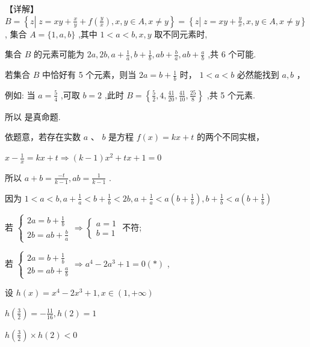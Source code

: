 \documentclass[10pt]{article}
\newcommand*\circled[1]{\tikz[baseline=(char.base)]{\node[shape=circle,draw,inner sep=1.5pt] (char) {\small #1};}}
\begin{document}
【详解】 \(B = \left\{  {z\left| {\;z = {xy} + \frac{x}{y} + f\left( \frac{y}{x}\right) }\right. ,x,y \in  A,x \neq  y}\right\}   = \left\{  {z\left| {\;z = {xy} + \frac{y}{x}}\right. ,x,y \in  A,x \neq  y}\right\}\) , 集合 \(A = \{ 1,a,b\}\) ,其中 \(1 < a < b,x,y\) 取不同元素时,

集合 \(B\) 的元素可能为 \({2a},{2b},a + \frac{1}{a},b + \frac{1}{b},{ab} + \frac{b}{a},{ab} + \frac{a}{b}\) ,共 6 个可能.

 \circled{1} 若集合 \(B\) 中恰好有 5 个元素，则当 \({2a} = b + \frac{1}{b}\) 时， \(1 < a < b\) 必然能找到 \(a,b\) ，

例如: 当 \(a = \frac{5}{4}\) ,可取 \(b = 2\) ,此时 \(B = \left\{  {\frac{5}{2},4,\frac{41}{20},\frac{41}{10},\frac{25}{8}}\right\}\) ,共 5 个元素.

所以 \circled{1} 是真命题.

 \circled{2} 依题意，若存在实数 \(a\text{ 、 }b\) 是方程 \(f\left( x\right)  = {kx} + t\) 的两个不同实根，

\(x - \frac{1}{x} = {kx} + t \Rightarrow  \left( {k - 1}\right) {x}^{2} + {tx} + 1 = 0\)

所以 \(a + b = \frac{-t}{k - 1},{ab} = \frac{1}{k - 1}\) .

因为 \(1 < a < b,a + \frac{1}{a} < b + \frac{1}{b} < {2b},a + \frac{1}{a} < a\left( {b + \frac{1}{b}}\right) ,b + \frac{1}{b} < a\left( {b + \frac{1}{b}}\right)\)

若 \(\left\{  {\begin{array}{l} {2a} = b + \frac{1}{b} \\  {2b} = {ab} + \frac{b}{a} \end{array} \Rightarrow  \left\{  \begin{array}{l} a = 1 \\  b = 1 \end{array}\right. }\right.\) 不符;

若 \(\left\{  {\begin{array}{l} {2a} = b + \frac{1}{b} \\  {2b} = {ab} + \frac{a}{b} \end{array} \Rightarrow  {a}^{4} - 2{a}^{3} + 1 = 0}\right. \left( *\right)\) ,

设 \(h\left( x\right)  = {x}^{4} - 2{x}^{3} + 1,x \in  \left( {1, + \infty }\right)\)

\(h\left( \frac{3}{2}\right)  =  - \frac{11}{16},h\left( 2\right)  = 1\)

\(h\left( \frac{3}{2}\right)  \times  h\left( 2\right)  < 0\)
\end{document}
